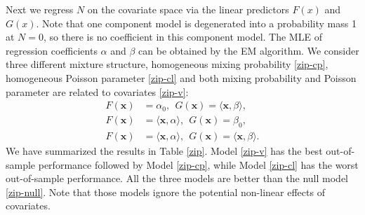 \documentclass[11pt]{article}
\numberwithin{equation}{section}
\def\bx{\boldsymbol{x}}
\begin{document}
Next we regress $N$ on the covariate space via the linear predictors $F(x)$ and $G(x)$.
Note that one component model is degenerated into a probability mass 1 at $N=0$, so there is no coefficient in this component model. The MLE of regression coefficients $\alpha$ and $\beta$ can be obtained by the EM algorithm.
We consider three different mixture structure, homogeneous mixing probability \eqref{zip-cp}, homogeneous Poisson parameter \eqref{zip-cl} and both  mixing probability and Poisson parameter are related to covariates \eqref{zip-v}:
\begin{align}
F(\bx)&=\alpha_0, ~~G(\bx)=\langle \bx,\beta\rangle, \label{zip-cp} \\
F(\bx)&=\langle \bx,\alpha\rangle, ~~G(\bx)=\beta_0, \label{zip-cl} \\
F(\bx)&=\langle \bx,\alpha\rangle, ~~G(\bx)=\langle \bx,\beta\rangle. \label{zip-v}
\end{align}  
We have summarized the results in Table \ref{zip}.
Model \eqref{zip-v} has the best out-of-sample performance followed by Model \eqref{zip-cp}, while Model \eqref{zip-cl} has the worst out-of-sample performance.
All the three models are better than the null model \eqref{zip-null}.
Note that those models ignore the potential non-linear effects of covariates.
\end{document}
